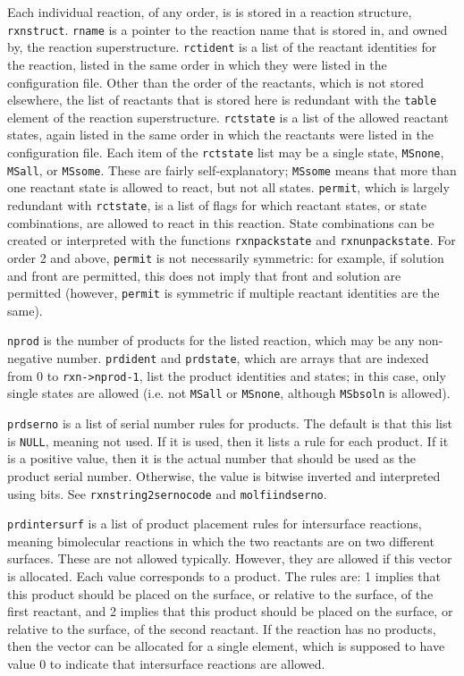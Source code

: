 \documentclass {scrbook}
\newcommand {\ttt} {\texttt}
\begin{document}
Each individual reaction, of any order, is is stored in a reaction structure, \ttt{rxnstruct}. \ttt{rname} is a pointer to the reaction name that is stored in, and owned by, the reaction superstructure. \ttt{rctident} is a list of the reactant identities for the reaction, listed in the same order in which they were listed in the configuration file. Other than the order of the reactants, which is not stored elsewhere, the list of reactants that is stored here is redundant with the \ttt{table} element of the reaction superstructure. \ttt{rctstate} is a list of the allowed reactant states, again listed in the same order in which the reactants were listed in the configuration file. Each item of the \ttt{rctstate} list may be a single state, \ttt{MSnone}, \ttt{MSall}, or \ttt{MSsome}. These are fairly self-explanatory; \ttt{MSsome} means that more than one reactant state is allowed to react, but not all states. \ttt{permit}, which is largely redundant with \ttt{rctstate}, is a list of flags for which reactant states, or state combinations, are allowed to react in this reaction. State combinations can be created or interpreted with the functions \ttt{rxnpackstate} and \ttt{rxnunpackstate}. For order 2 and above, \ttt{permit} is not necessarily symmetric: for example, if solution and front are permitted, this does not imply that front and solution are permitted (however, \ttt{permit} is symmetric if multiple reactant identities are the same).

\ttt{nprod} is the number of products for the listed reaction, which may be any non-negative number. \ttt{prdident} and \ttt{prdstate}, which are arrays that are indexed from 0 to \ttt{rxn->nprod-1}, list the product identities and states; in this case, only single states are allowed (i.e. not \ttt{MSall} or \ttt{MSnone}, although \ttt{MSbsoln} is allowed).

\ttt{prdserno} is a list of serial number rules for products. The default is that this list is \ttt{NULL}, meaning not used. If it is used, then it lists a rule for each product. If it is a positive value, then it is the actual number that should be used as the product serial number. Otherwise, the value is bitwise inverted and interpreted using bits. See \ttt{rxnstring2sernocode} and \ttt{molfiindserno}.

\ttt{prdintersurf} is a list of product placement rules for intersurface reactions, meaning bimolecular reactions in which the two reactants are on two different surfaces. These are not allowed typically. However, they are allowed if this vector is allocated. Each value corresponds to a product. The rules are: 1 implies that this product should be placed on the surface, or relative to the surface, of the first reactant, and 2 implies that this product should be placed on the surface, or relative to the surface, of the second reactant. If the reaction has no products, then the vector can be allocated for a single element, which is supposed to have value 0 to indicate that intersurface reactions are allowed.
\end{document}
